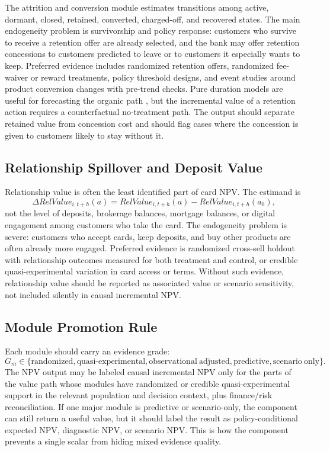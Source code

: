 \documentclass[11pt]{article}
\newcommand{\1}{\mathbf{1}}
\begin{document}
The attrition and conversion module estimates transitions among active,
dormant, closed, retained, converted, charged-off, and recovered states. The
main endogeneity problem is survivorship and policy response: customers who
survive to receive a retention offer are already selected, and the bank may
offer retention concessions to customers predicted to leave or to customers it
especially wants to keep. Preferred evidence includes randomized retention
offers, randomized fee-waiver or reward treatments, policy threshold designs,
and event studies around product conversion changes with pre-trend checks.
Pure duration models are useful for forecasting the organic path
\citep{schmittlein1987counting,fader2005bgnbd,bolton1998duration}, but the
incremental value of a retention action requires a counterfactual no-treatment
path. The output should separate retained value from concession cost and
should flag cases where the concession is given to customers likely to stay
without it.

\subsection*{Relationship Spillover and Deposit Value}

Relationship value is often the least identified part of card NPV. The
estimand is
\[
  \Delta RelValue_{i,t+h}(a)
  =
  RelValue_{i,t+h}(a)-RelValue_{i,t+h}(a_0),
\]
not the level of deposits, brokerage balances, mortgage balances, or digital
engagement among customers who take the card. The endogeneity problem is
severe: customers who accept cards, keep deposits, and buy other products are
often already more engaged. Preferred evidence is randomized cross-sell
holdout with relationship outcomes measured for both treatment and control, or
credible quasi-experimental variation in card access or terms. Without such
evidence, relationship value should be reported as associated value or
scenario sensitivity, not included silently in causal incremental NPV.

\subsection*{Module Promotion Rule}

Each module should carry an evidence grade:
\[
  G_m\in
  \{\mathrm{randomized},\mathrm{quasi\text{-}experimental},
    \mathrm{observational\ adjusted},\mathrm{predictive},
    \mathrm{scenario\ only}\}.
\]
The NPV output may be labeled causal incremental NPV only for the parts of the
value path whose modules have randomized or credible quasi-experimental
support in the relevant population and decision context, plus finance/risk
reconciliation. If one major module is predictive or scenario-only, the
component can still return a useful value, but it should label the result as
policy-conditional expected NPV, diagnostic NPV, or scenario NPV. This is how
the component prevents a single scalar from hiding mixed evidence quality.
\end{document}
